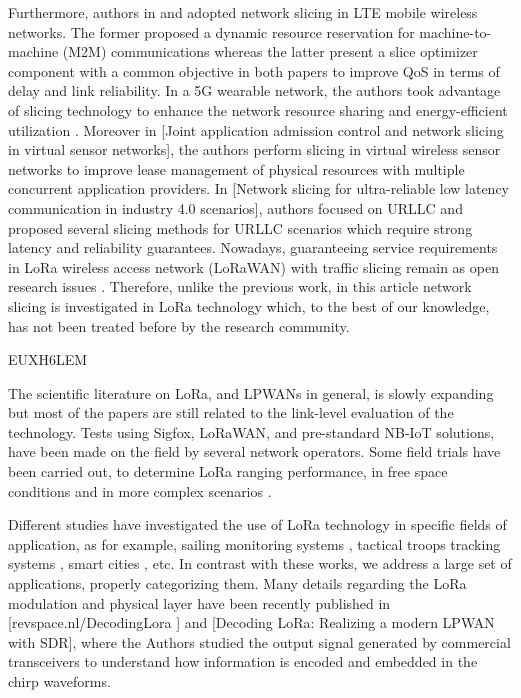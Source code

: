 Furthermore,
	authors in \cite{gadallah_dynamic_2017} and \cite{rezende_adaptive_2018-1} adopted network slicing in LTE mobile wireless networks.
The former proposed a dynamic resource reservation for machine-to-machine (M2M) communications whereas the latter present a slice optimizer component with a common objective in both papers to improve QoS in terms of delay and link reliability.
In a 5G wearable network,
	the authors took advantage of slicing technology to enhance the network resource sharing and energy-efficient utilization \cite{hao_network_2018}.
Moreover in [Joint application admission control and network slicing in virtual sensor networks],
	the authors perform slicing in virtual wireless sensor networks to improve lease management of physical resources with multiple concurrent application providers.
In [Network slicing for ultra-reliable low latency communication in industry 4.0 scenarios],
	authors focused on URLLC and proposed several slicing methods for URLLC scenarios which require strong latency and reliability guarantees.
Nowadays,
	guaranteeing service requirements in LoRa wireless access network (LoRaWAN) with traffic slicing remain as open research issues \cite{adelantado_understanding_2017}.
Therefore,
	unlike the previous work,
	in this article network slicing is investigated in LoRa technology which,
	to the best of our knowledge,
	has not been treated before by the research community.

\cite{feltrin_lorawan_2018} EUXH6LEM

The scientific literature on LoRa,
	and LPWANs in general,
	is slowly expanding but most of the papers are still related to the link-level evaluation of the technology.
Tests using Sigfox,
	LoRaWAN,
	and pre-standard NB-IoT solutions,
	have been made on the field by several network operators.
Some field trials have been carried out,
	to determine LoRa ranging performance,
	in free space conditions \cite{aref_free_2014-1} and in more complex scenarios \cite{petajajarvi_coverage_2015}.

Different studies have investigated the use of LoRa technology in specific fields of application,
	as for example,
	sailing monitoring systems \cite{li_application_2017},
	tactical troops tracking systems \cite{san-um_long-range_2017},
	smart cities \cite{stan_overview_2016},
	etc.
In contrast with these works,
	we address a large set of applications,
	properly categorizing them.
Many details regarding the LoRa modulation and physical layer have been recently published in [revspace.nl/DecodingLora ] and [Decoding LoRa:
	Realizing a modern LPWAN with SDR],
	where the Authors studied the output signal generated by commercial transceivers to understand how information is encoded and embedded in the chirp waveforms.

